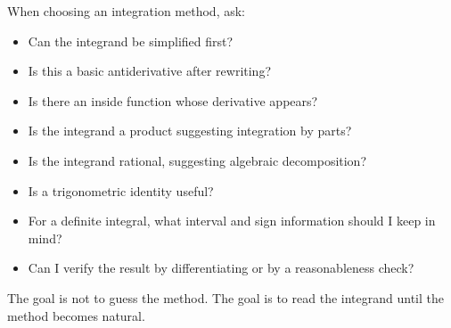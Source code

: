 \begin{summarybox}
When choosing an integration method, ask:
\begin{itemize}
\item Can the integrand be simplified first?
\item Is this a basic antiderivative after rewriting?
\item Is there an inside function whose derivative appears?
\item Is the integrand a product suggesting integration by parts?
\item Is the integrand rational, suggesting algebraic decomposition?
\item Is a trigonometric identity useful?
\item For a definite integral, what interval and sign information should I keep in mind?
\item Can I verify the result by differentiating or by a reasonableness check?
\end{itemize}
\end{summarybox}

The goal is not to guess the method. The goal is to read the integrand until the method becomes natural.